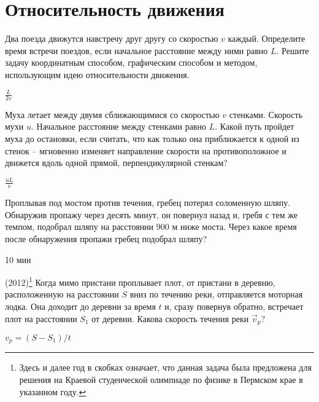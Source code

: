 \section{Относительность движения}

\begin{ex}
Два поезда движутся навстречу друг другу со скоростью $v$ каждый. 
Определите время встречи поездов, если начальное расстояние между ними равно $L$. 
Решите задачу координатным способом, графическим способом и методом, использующим идею относительности движения.
\begin{ans}
$\frac{L}{2v}$
\end{ans}
\end{ex}

\begin{ex}
Муха летает между двумя сближающимися со скоростью $v$ стенками. 
Скорость мухи $u$. Начальное расстояние между стенками равно $L$. 
Какой путь пройдет муха до остановки, если считать, что как только она приближается к одной из стенок -- мгновенно изменяет 
направление скорости на противоположное и движется вдоль одной прямой, перпендикулярной стенкам?
\begin{ans}
$\frac{uL}{v}$
\end{ans}
\end{ex}

\begin{ex}
Проплывая под мостом против течения, гребец потерял соломенную шляпу. Обнаружив пропажу через десять минут, он повернул назад и, гребя с тем же темпом, подобрал шляпу на расстоянии 900 м ниже моста. 
Через какое время после обнаружения пропажи гребец подобрал шляпу?
\begin{ans}
10 мин
\end{ans}
\end{ex}

\begin{ex}
(2012)\footnote{Здесь и далее год в скобках означает, что данная задача была предложена для решения на Краевой студенческой олимпиаде по физике в Пермском крае в указанном году.}
Когда мимо пристани проплывает плот, от пристани в деревню, расположенную на расстоянии $S$ вниз по течению реки, отправляется моторная лодка. Она доходит до деревни за время $t$ и, сразу повернув обратно, встречает плот на расстоянии $ S_1 $ от деревни. Какова скорость течения реки $\vec{v}_p$?
\begin{ans}
$v_p = (S - S_1)/t$
\end{ans}
\end{ex}

